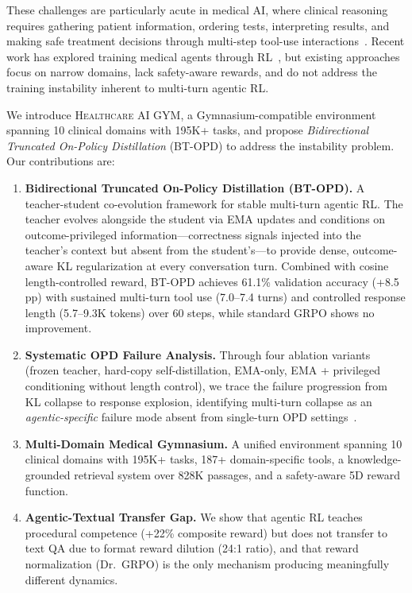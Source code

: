 \documentclass{article}
\newcommand{\gym}{\textsc{Healthcare AI GYM}}
\begin{document}
These challenges are particularly acute in medical AI, where clinical reasoning requires gathering patient information, ordering tests, interpreting results, and making safe treatment decisions through multi-step tool-use interactions~\citep{nori2023gpt4, singhal2023medpalm2}. Recent work has explored training medical agents through RL~\citep{medagentgym2026, schmidgall2025agentclinic}, but existing approaches focus on narrow domains, lack safety-aware rewards, and do not address the training instability inherent to multi-turn agentic RL.

We introduce \gym{}, a Gymnasium-compatible environment spanning 10 clinical domains with 195K+ tasks, and propose \emph{Bidirectional Truncated On-Policy Distillation} (BT-OPD) to address the instability problem. Our contributions are:

\begin{enumerate}
    \item \textbf{Bidirectional Truncated On-Policy Distillation (BT-OPD).} A teacher-student co-evolution framework for stable multi-turn agentic RL. The teacher evolves alongside the student via EMA updates and conditions on outcome-privileged information---correctness signals injected into the teacher's context but absent from the student's---to provide dense, outcome-aware KL regularization at every conversation turn. Combined with cosine length-controlled reward, BT-OPD achieves 61.1\% validation accuracy (+8.5 pp) with sustained multi-turn tool use (7.0--7.4 turns) and controlled response length (5.7--9.3K tokens) over 60 steps, while standard GRPO shows no improvement.

    \item \textbf{Systematic OPD Failure Analysis.} Through four ablation variants (frozen teacher, hard-copy self-distillation, EMA-only, EMA + privileged conditioning without length control), we trace the failure progression from KL collapse to response explosion, identifying multi-turn collapse as an \emph{agentic-specific} failure mode absent from single-turn OPD settings~\citep{yang26rlsd, zhao26opsd}.

    \item \textbf{Multi-Domain Medical Gymnasium.} A unified environment spanning 10 clinical domains with 195K+ tasks, 187+ domain-specific tools, a knowledge-grounded retrieval system over 828K passages, and a safety-aware 5D reward function.

    \item \textbf{Agentic-Textual Transfer Gap.} We show that agentic RL teaches procedural competence (+22\% composite reward) but does not transfer to text QA due to format reward dilution (24:1 ratio), and that reward normalization (Dr.~GRPO) is the only mechanism producing meaningfully different dynamics.
\end{enumerate}
\end{document}
